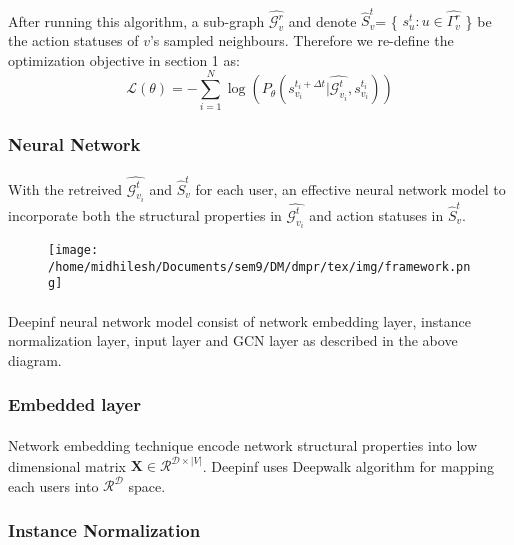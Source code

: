 \paragraph{} After running this algorithm, a sub-graph $\hat{\mathcal{G}_v^r}$ and denote $\hat{S}_v^t$=
\{ $s_u^t :u \in \hat{\Gamma_v^r}$ \} be the action statuses of $v$'s sampled neighbours. Therefore we re-define the optimization
objective in section 1 as:
\begin{equation}
    \mathcal{L}(\theta) = -\sum_{i=1}^N \log(P_{\theta}(s_{v_i}^{t_i+\Delta t}|\hat{\mathcal{G}_{v_i}^{t}},s_{v_i}^{t_i}))
\end{equation}
\subsubsection{Neural Network}
\paragraph{} With the retreived $\hat{\mathcal{G}_{v_i}^{t}}$ and $\hat{S}_v^t$ for each user, an effective
neural network model to incorporate both the structural properties in $\hat{\mathcal{G}_{v_i}^{t}}$ and action statuses in 
$\hat{S}_v^t$.
\begin{figure}
    \texttt{[image: /home/midhilesh/Documents/sem9/DM/dmpr/tex/img/framework.png]}
\end{figure}
\paragraph{} Deepinf neural network model consist of network embedding layer, instance normalization layer, input layer
and GCN layer as described in the above diagram.
\subsubsection{Embedded layer}
\paragraph{} Network embedding technique encode network structural properties into low dimensional matrix $\mathbf{X} \in
\mathcal{R}^{\mathcal{D} \times |V|}$. Deepinf uses Deepwalk algorithm for mapping each users into $\mathcal{R}^{\mathcal{D}}$
space.
\subsubsection{Instance Normalization}
